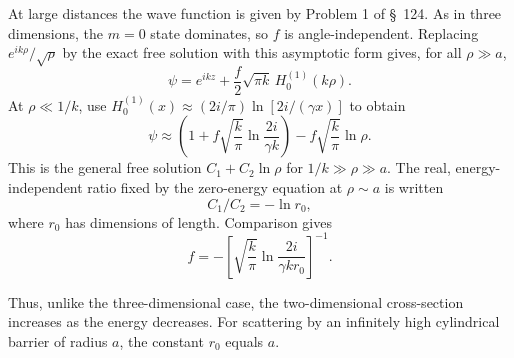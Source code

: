 \SolutionHeading At large distances the wave function is given by Problem 1
of \S~124. As in three dimensions, the $m=0$ state dominates, so $f$ is
angle-independent. Replacing $e^{ik\rho}/\sqrt\rho$ by the exact free solution
with this asymptotic form gives, for all $\rho\gg a$,
\begin{equation}
 \psi=e^{ikz}+\frac f2\sqrt{\pi k}\,H_0^{(1)}(k\rho). \tag{1}
\end{equation}
At $\rho\ll1/k$, use
$H_0^{(1)}(x)\approx(2i/\pi)\ln[2i/(\gamma x)]$ to obtain
\begin{equation}
 \psi\approx\left(1+f\sqrt{\frac{k}{\pi}}
 \ln\frac{2i}{\gamma k}\right)
 -f\sqrt{\frac{k}{\pi}}\ln\rho. \tag{2}
\end{equation}
This is the general free solution $C_1+C_2\ln\rho$ for
$1/k\gg\rho\gg a$. The real, energy-independent ratio fixed by the zero-energy
equation at $\rho\sim a$ is written
\begin{equation}
 C_1/C_2=-\ln r_0, \tag{3}
\end{equation}
where $r_0$ has dimensions of length. Comparison gives
\begin{equation}
 f=-\left[\sqrt{\frac{k}{\pi}}
 \ln\frac{2i}{\gamma kr_0}\right]^{-1}. \tag{4}
\end{equation}

Thus, unlike the three-dimensional case, the two-dimensional cross-section
increases as the energy decreases. For scattering by an infinitely high
cylindrical barrier of radius $a$, the constant $r_0$ equals $a$.
